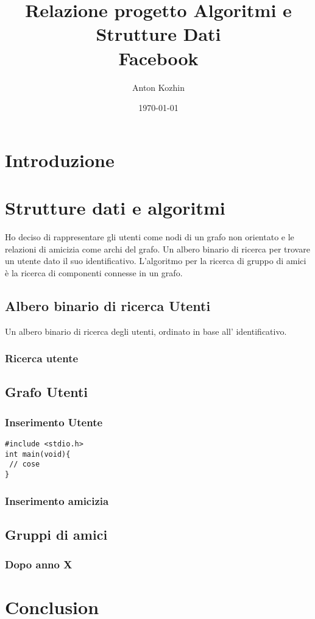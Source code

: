 \documentclass{article}
\begin{document}
\title{ Relazione progetto Algoritmi e Strutture Dati \\ Facebook }
\author{ Anton Kozhin }
\date{\today}
\maketitle

\section{Introduzione}
\section{Strutture dati e algoritmi}
Ho deciso di rappresentare gli utenti come nodi di un grafo non orientato e
le relazioni di amicizia come archi del grafo.
Un albero binario di ricerca per trovare un utente dato il suo
identificativo.
L'algoritmo per la ricerca di gruppo di amici è la ricerca di componenti
connesse in un grafo.
\subsection{Albero binario di ricerca Utenti}
Un albero binario di ricerca degli utenti, ordinato in base all' identificativo.

\subsubsection{Ricerca utente}
\subsection{Grafo Utenti}
\subsubsection{Inserimento Utente}
\begin{lstlisting}
#include <stdio.h>
int main(void){
 // cose
}
\end{lstlisting}
\subsubsection{Inserimento amicizia}
\subsection{Gruppi di amici}
\subsubsection{Dopo anno X}

\section{Conclusion}
\end{document}
